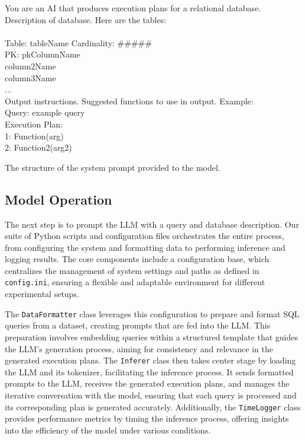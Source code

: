 \begin{text}
  You are an AI that produces execution plans for a relational database. Description of database. Here are the tables:\\
  \\
  Table: tableName Cardinality: \#\#\#\#\#\\
  PK: pkColumnName\\
  column2Name\\
  column3Name\\
  ...\\
  Output instructions. Suggested functions to use in output. Example:\\
  Query: example query\\
  Execution Plan:\\
  1: Function(arg)\\
  2: Function2(arg2)
  \caption{The structure of the system prompt provided to the model.}
  \label{text:sysPrompt}
\end{text}

\subsection{Model Operation}
The next step is to prompt the LLM with a query and database description. Our suite of Python scripts and configuration files orchestrates the entire process, from configuring the system and formatting data to performing inference and logging results. The core components include a configuration base, which centralizes the management of system settings and paths as defined in \lstinline{config.ini}, ensuring a flexible and adaptable environment for different experimental setups.

The \lstinline{DataFormatter} class leverages this configuration to prepare and format SQL queries from a dataset, creating prompts that are fed into the LLM. This preparation involves embedding queries within a structured template that guides the LLM's generation process, aiming for consistency and relevance in the generated execution plans. The \lstinline{Inferer} class then takes center stage by loading the LLM and its tokenizer, facilitating the inference process. It sends formatted prompts to the LLM, receives the generated execution plans, and manages the iterative conversation with the model, ensuring that each query is processed and its corresponding plan is generated accurately. Additionally, the \lstinline{TimeLogger} class provides performance metrics by timing the inference process, offering insights into the efficiency of the model under various conditions.

